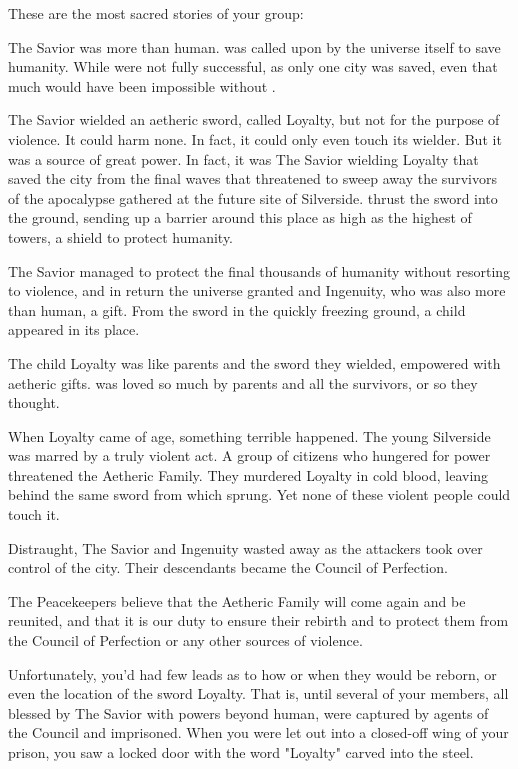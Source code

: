 \documentclass[blue]{Silversiders}
\begin{document}
These are the most sacred stories of your group:
\begin{itemz}
	\item The Savior was more than human. \cSavior{\They} was called upon by the universe itself to save humanity. While \cSavior{\they} were not fully successful, as only one city was saved, even that much would have been impossible without \cSavior{\them}.
	\item The Savior wielded an aetheric sword, called Loyalty, but not for the purpose of violence. It could harm none. In fact, it could only even touch its wielder. But it was a source of great power. In fact, it was The Savior wielding Loyalty that saved the city from the final waves that threatened to sweep away the survivors of the apocalypse gathered at the future site of Silverside. \cSavior{\They} thrust the sword into the ground, sending up a barrier around this place as high as the highest of towers, a shield to protect humanity.
	\item The Savior managed to protect the final thousands of humanity without resorting to violence, and in return the universe granted \cSavior{\them} and \cSavior{\their} \cIngenuityOld{\spouse} Ingenuity, who was also more than human, a gift. From the sword in the quickly freezing ground, a child appeared in its place.
	\item The child Loyalty was like \cLoyalty{\their} parents and the sword they wielded, empowered with aetheric gifts. \cLoyalty{\They} was loved so much by \cLoyalty{\their} parents and all the survivors, or so they thought.
	\item When Loyalty came of age, something terrible happened. The young Silverside was marred by a truly violent act. A group of citizens who hungered for power threatened the Aetheric Family. They murdered Loyalty in cold blood, leaving behind the same sword from which \cLoyalty{\they} sprung. Yet none of these violent people could touch it.
	\item Distraught, The Savior and Ingenuity wasted away as the attackers took over control of the city. Their descendants became the Council of Perfection.
	\item The Peacekeepers believe that the Aetheric Family will come again and be reunited, and that it is our duty to ensure their rebirth and to protect them from the Council of Perfection or any other sources of violence.

\end{itemz}

Unfortunately, you'd had few leads as to how or when they would be reborn, or even the location of the sword Loyalty. That is, until several of your members, all blessed by The Savior with powers beyond human, were captured by agents of the Council and imprisoned. When you were let out into a closed-off wing of your prison, you saw a locked door with the word "Loyalty" carved into the steel.
\end{document}
